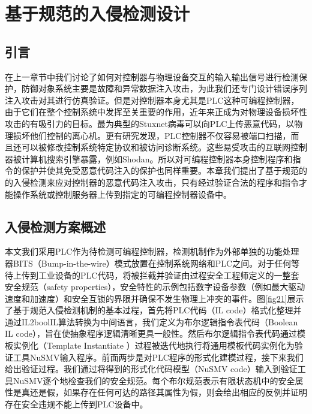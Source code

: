 

\chapter{基于规范的入侵检测设计}
\label{chap:spec detection}

\section{引言}
\label{sec:intro}
在上一章节中我们讨论了如何对控制器与物理设备交互的输入输出信号进行检测保护，防御对象系统主要是故障和异常数据注入攻击，为此我们还专门设计错误序列注入攻击对其进行仿真验证。但是对控制器本身尤其是PLC这种可编程控制器，由于它们在整个控制系统中发挥至关重要的作用，近年来正成为对物理设备损坏性攻击的有吸引力的目标。最为典型的Stuxnet病毒可以向PLC上传恶意代码，以物理损坏他们控制的离心机。更有研究发现，PLC控制器不仅容易被端口扫描，而且还可以被修改控制系统特定协议和被访问诊断系统。这些易受攻击的互联网控制器被计算机搜索引擎暴露，例如Shodan。所以对可编程控制器本身控制程序和指令的保护并使其免受恶意代码注入的保护也同样重要。本章我们提出了基于规范的的入侵检测来应对控制器的恶意代码注入攻击，只有经过验证合法的程序和指令才能操作系统或控制服务器上传到指定的可编程控制器设备中。

\section{入侵检测方案概述}
\label{sec:list}

本文我们采用PLC作为待检测可编程控制器，检测机制作为外部单独的功能处理器BITS（Bump-in-the-wire）模式放置在控制系统网络和PLC之间。对于任何等待上传到工业设备的PLC代码，将被拦截并验证由过程安全工程师定义的一整套安全规范（safety properties），安全特性的示例包括数字设备参数（例如最大驱动速度和加速度）和安全互锁的界限并确保不发生物理上冲突的事件。图\ref{fig21}展示了基于规范入侵检测机制的基本过程，首先将PLC代码（IL code）格式化整理并通过IL2boolIL算法转换为中间语言，我们定义为布尔逻辑指令表代码（Boolean IL code），旨在使抽象程序逻辑清晰更具一般性。然后布尔逻辑指令表代码通过模板实例化（Template Instantiate
）过程被迭代地执行将通用模板代码实例化为验证工具NuSMV输入程序。前面两步是对PLC程序的形式化建模过程，接下来我们给出验证过程。我们通过将得到的形式化代码模型（NuSMV code）输入到验证工具NuSMV逐个地检查我们的安全规范。每个布尔规范表示有限状态机中的安全属性是真还是假，如果存在任何可达的路径其属性为假，则会给出相应的反例并证明存在安全违规不能上传到PLC设备中。

